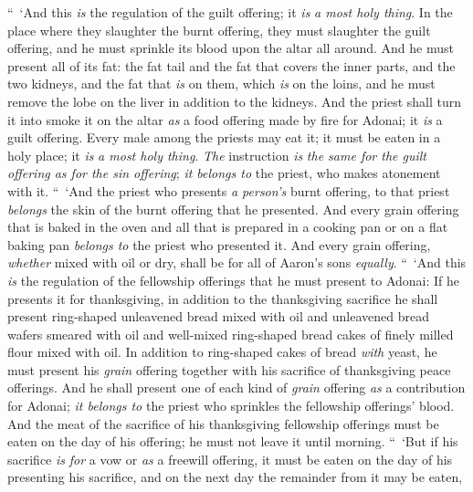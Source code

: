 \begin{biblechapter} %
 “ ‘And this \textit{is} the regulation of the guilt offering; it \textit{is} \textit{a most holy thing}.
\verse In the place where they slaughter the burnt offering, they must slaughter the guilt offering, and he must sprinkle its blood upon the altar all around.
\verse And he must present all of its fat: the fat tail and the fat that covers the inner parts,
\verse and the two kidneys, and the fat that \textit{is} on them, which \textit{is} on the loins, and he must remove the lobe on the liver in addition to the kidneys.
\verse And the priest shall turn it into smoke it on the altar \textit{as} a food offering made by fire for Adonai; it \textit{is} a guilt offering.
\verse Every male among the priests may eat it; it must be eaten in a holy place; it \textit{is} \textit{a most holy thing}.
\verse \textit{The} instruction \textit{is} \textit{the same for the guilt offering as for the sin offering}; \textit{it belongs to} the priest, who makes atonement with it.
 “ ‘And the priest who presents \textit{a person’s} burnt offering, to that priest \textit{belongs} the skin of the burnt offering that he presented.
\verse And every grain offering that is baked in the oven and all that is prepared in a cooking pan or on a flat baking pan \textit{belongs to} the priest who presented it.
\verse And every grain offering, \textit{whether} mixed with oil or dry, shall be for all of Aaron’s sons \textit{equally}.
 “ ‘And this \textit{is} the regulation of the fellowship offerings that he must present to Adonai:
\verse If he presents it for thanksgiving, in addition to the thanksgiving sacrifice he shall present ring-shaped unleavened bread mixed with oil and unleavened bread wafers smeared with oil and well-mixed ring-shaped bread cakes of finely milled flour mixed with oil.
\verse In addition to ring-shaped cakes of bread \textit{with} yeast, he must present his \textit{grain} offering together with his sacrifice of thanksgiving peace offerings.
\verse And he shall present one of each kind of \textit{grain} offering \textit{as} a contribution for Adonai; \textit{it belongs to} the priest who sprinkles the fellowship offerings’ blood.
\verse And the meat of the sacrifice of his thanksgiving fellowship offerings must be eaten on the day of his offering; he must not leave it until morning.
\verse “ ‘But if his sacrifice \textit{is} \textit{for} a vow or \textit{as} a freewill offering, it must be eaten on the day of his presenting his sacrifice, and on the next day the remainder from it may be eaten,

\end{biblechapter}
